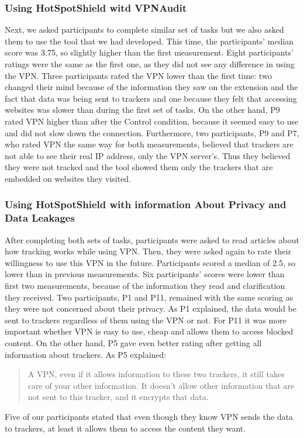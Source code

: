 \subsubsection{Using HotSpotShield witd VPNAudit}

Next, we asked participants to complete similar set of tasks but we also asked
them to use the tool that we had developed. This time, the participants'
median score was  3.75, so slightly higher than the first measurement. Eight
participants' ratings were the same as the first one, as they did not see any
difference in using the VPN. Three participants rated the VPN lower than the
first time: two changed their mind because of the information they saw on the
extension and the fact that data was being sent to trackers and one because
they felt that accessing websites was slower than during the first set of
tasks.  On the other hand, P9 rated VPN higher than after the Control
condition, because it seemed easy to use and did not slow down the connection.
Furthermore, two participants, P9 and P7, who rated VPN the same way for both
measurements, believed that trackers are not able to see their real IP
address, only the VPN server’s. Thus they believed they were not tracked and
the tool showed them only the trackers that are embedded on websites they
visited. 

\subsubsection{Using HotSpotShield with  information About Privacy and Data Leakages} 

After completing both sets of tasks, participants were asked to read articles
about how tracking works while using VPN. Then, they were asked again to rate
their willingness to use this VPN in the future. Participants scored a median
of 2.5, so lower than in previous measurements. Six participants' scores were
lower than first two measurements, because of the information they read and
clarification they received. Two participants, P1 and P11, remained with the
same scoring as they were not concerned about their privacy. As P1 explained,
the data would be sent to trackers regardless of them using the VPN or not.
For P11 it was more important whether VPN is easy to use, cheap and allows
them to access blocked content. On the other hand, P5 gave even better rating
after getting all information about trackers. As P5 explained:

\begin{quote}A VPN, even if it allows information to these two trackers, it
still takes care of your other information. It doesn't allow other information
that are not sent to this tracker, and it encrypts that data.\end{quote} Five
of our participants stated that even though they know VPN sends the data to
trackers, at least it allows them to access the content they want.   



